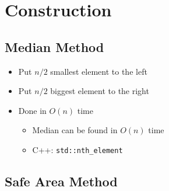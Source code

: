 \documentclass[letterpaper, 11pt]{article}
\begin{document}
  \section{Construction}

    \subsection{Median Method}

      \begin{itemize}
        \item Put $ n / 2 $ smallest element to the left
        \item Put $ n / 2 $ biggest element to the right
        \item Done in $ O\left( n \right) $ time
        \begin{itemize}
          \item Median can be found in $ O\left( n \right) $ time
          \item C++: \texttt{std::nth\_element}
        \end{itemize}
      \end{itemize}

    \subsection{Safe Area Method}
\end{document}
